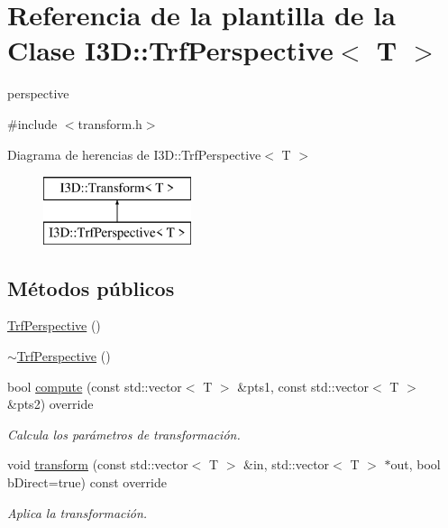\hypertarget{class_i3_d_1_1_trf_perspective}{}\section{Referencia de la plantilla de la Clase I3D\+:\+:Trf\+Perspective$<$ T $>$}
\label{class_i3_d_1_1_trf_perspective}


perspective  




{\ttfamily \#include $<$transform.\+h$>$}

Diagrama de herencias de I3D\+:\+:Trf\+Perspective$<$ T $>$\begin{figure}[H]
\begin{center}
\leavevmode
\includegraphics[height=2.000000cm]{class_i3_d_1_1_trf_perspective}
\end{center}
\end{figure}
\subsection*{Métodos públicos}
\begin{DoxyCompactItemize}
\item 
\hyperlink{class_i3_d_1_1_trf_perspective_a6f0b52bf124ae94eb6cab55fbcfb85b7}{Trf\+Perspective} ()
\item 
\hyperlink{class_i3_d_1_1_trf_perspective_a6cab003ac2b49d52ae8b29a2ceea99f1}{$\sim$\+Trf\+Perspective} ()
\item 
bool \hyperlink{group__trf2_d_group_gaf4d7f0809edd08cc847f3df1db43055e}{compute} (const std\+::vector$<$ T $>$ \&pts1, const std\+::vector$<$ T $>$ \&pts2) override
\begin{DoxyCompactList}\small\item\em Calcula los parámetros de transformación. \end{DoxyCompactList}\item 
void \hyperlink{group__trf2_d_group_ga0742db3f66df991a7e4a2d1d91d1a783}{transform} (const std\+::vector$<$ T $>$ \&in, std\+::vector$<$ T $>$ $\ast$out, bool b\+Direct=true) const  override
\begin{DoxyCompactList}\small\item\em Aplica la transformación. \end{DoxyCompactList}\end{DoxyCompactItemize}
